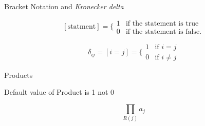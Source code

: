 \documentclass[12pt]{article}
\begin{document}
   Bracket Notation and {\sl Kronecker delta}

   $$[\mbox{statment}] = \Biggr\{\begin{array}{ll} 1 & \mbox{if the statement is true}\\
     0 & \mbox{if the statement is false.}
     \end{array}
   $$

   $$\delta_{ij} = [i = j] = \Biggr\{ \begin{array}{ll} 1 & \mbox{if $i = j$} \\
     0 &  \mbox{if $i \ne j$} 
   \end{array} $$


  \begin{center}
    Products
  \end{center}

  Default value of Product is 1 not 0

  \begin{equation}
    \prod_{R(j)}a_j
  \end{equation}
  

  
\end{document}
